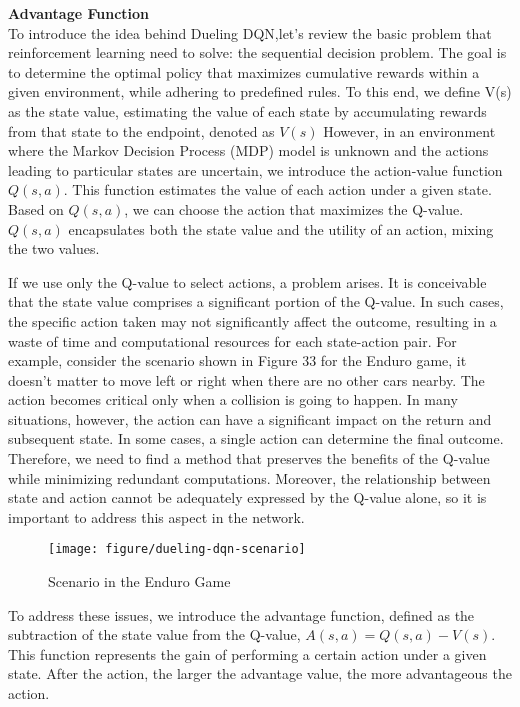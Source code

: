 \documentclass{article}
\begin{document}
\noindent
\textbf{Advantage Function}\\
\noindent
To introduce the idea behind Dueling DQN,let's review the basic problem that reinforcement learning need to solve: the sequential decision problem. The goal is to determine the optimal policy that maximizes cumulative rewards within a given environment, while adhering to predefined rules. To this end, we define V(s) as the state value, estimating the value of each state by accumulating rewards from that state to the endpoint, denoted as $V(s)$ However, in an environment where the Markov Decision Process (MDP) model is unknown and the actions leading to particular states are uncertain, we introduce the action-value function $Q(s,a)$. This function estimates the value of each action under a given state. Based on $Q(s,a)$, we can choose the action that maximizes the Q-value. $Q(s,a)$ encapsulates both the state value and the utility of an action, mixing the two values.

If we use only the Q-value to select actions, a problem arises. It is conceivable that the state value comprises a significant portion of the Q-value. In such cases, the specific action taken may not significantly affect the outcome, resulting in a waste of time and computational resources for each state-action pair. For example, consider the scenario shown in Figure 33 for the Enduro game, it doesn't matter to move left or right when there are no other cars nearby. The action becomes critical only when a collision is going to happen.  In many situations, however, the action can have a significant impact on the return and subsequent state. In some cases, a single action can determine the final outcome. Therefore, we need to find a method that preserves the benefits of the Q-value while minimizing redundant computations. Moreover, the relationship between state and action cannot be adequately expressed by the Q-value alone, so it is important to address this aspect in the network.

\begin{figure}[htbp]
        \centering
        \texttt{[image: figure/dueling-dqn-scenario]}
        \caption{Scenario in the Enduro Game}
\end{figure}


To address these issues, we introduce the advantage function, defined as the subtraction of the state value from the Q-value, $A(s,a) = Q(s,a) - V(s)$. This function represents the gain of performing a certain action under a given state. After the action, the larger the advantage value, the more advantageous the action.
\end{document}
